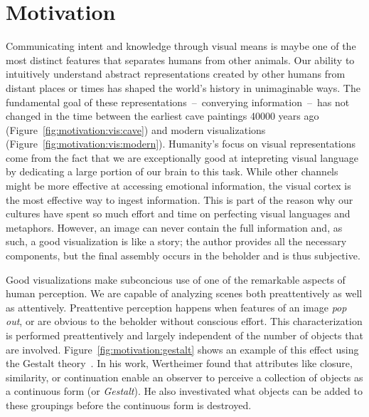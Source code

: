 \chapter{Motivation} \label{cha:motivation}
Communicating intent and knowledge through visual means is maybe one of the most distinct features that separates humans from other animals.  Our ability to intuitively understand abstract representations created by other humans from distant places or times has shaped the world's history in unimaginable ways.  The fundamental goal of these representations~--~converying information~--~has not changed in the time between the earliest cave paintings 40000 years ago (Figure~\ref{fig:motivation:vis:cave}) and modern visualizations (Figure~\ref{fig:motivation:vis:modern}).  Humanity's focus on visual representations come from the fact that we are exceptionally good at intepreting visual language by dedicating a large portion of our brain to this task.  While other channels might be more effective at accessing emotional information, the visual cortex is the most effective way to ingest information.  This is part of the reason why our cultures have spent so much effort and time on perfecting visual languages and metaphors.  However, an image can never contain the full information and, as such, a good visualization is like a story; the author provides all the necessary components, but the final assembly occurs in the beholder and is thus subjective.

Good visualizations make subconcious use of one of the remarkable aspects of human perception.  We are capable of analyzing scenes both preattentively as well as attentively.  Preattentive perception happens when features of an image \emph{pop out}, or are obvious to the beholder without conscious effort.  This characterization is performed preattentively and largely independent of the number of objects that are involved.  Figure~\ref{fig:motivation:gestalt} shows an example of this effect using the Gestalt theory~\cite{wertheimer1922untersuchungen}.  In his work, Wertheimer found that attributes like closure, similarity, or continuation enable an observer to perceive a collection of objects as a continuous form (or \emph{Gestalt}).  He also investivated what objects can be added to these groupings before the continuous form is destroyed. 


